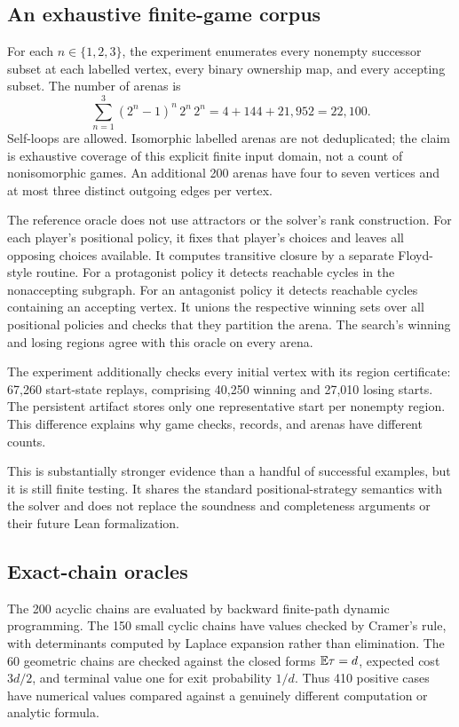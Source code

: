 \subsection{An exhaustive finite-game corpus}
For each $n\in\{1,2,3\}$, the experiment enumerates every nonempty successor
subset at each labelled vertex, every binary ownership map, and every accepting
subset. The number of arenas is
\[
 \sum_{n=1}^{3}(2^n-1)^n\,2^n\,2^n
   =4+144+21,952=22,100.
\]
Self-loops are allowed. Isomorphic labelled arenas are not deduplicated; the
claim is exhaustive coverage of this explicit finite input domain, not a count
of nonisomorphic games. An additional 200 arenas have four to seven vertices
and at most three distinct outgoing edges per vertex.

The reference oracle does not use attractors or the solver's rank construction.
For each player's positional policy, it fixes that player's choices and leaves
all opposing choices available. It computes transitive closure by a separate
Floyd-style routine. For a protagonist policy it detects reachable cycles in
the nonaccepting subgraph. For an antagonist policy it detects reachable cycles
containing an accepting vertex. It unions the respective winning sets over
all positional policies and checks that they partition the arena. The search's
winning and losing regions agree with this oracle on every arena.

The experiment additionally checks every initial vertex with its region
certificate: 67,260 start-state replays, comprising 40,250 winning and 27,010
losing starts. The persistent artifact stores only one representative start
per nonempty region. This difference explains why game checks, records, and
arenas have different counts.

This is substantially stronger evidence than a handful of successful examples,
but it is still finite testing. It shares the standard positional-strategy
semantics with the solver and does not replace the soundness and completeness
arguments or their future Lean formalization.

\subsection{Exact-chain oracles}
The 200 acyclic chains are evaluated by backward finite-path dynamic
programming. The 150 small cyclic chains have values checked by Cramer's rule,
with determinants computed by Laplace expansion rather than elimination. The
60 geometric chains are checked against the closed forms $\mathbb{E}\tau=d$,
expected cost $3d/2$, and terminal value one for exit probability $1/d$.
Thus 410 positive cases have numerical values compared against a genuinely
different computation or analytic formula.

